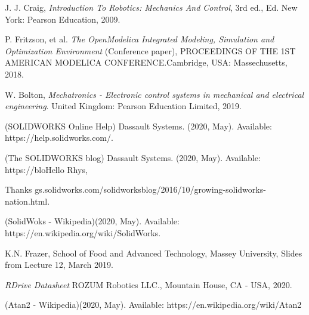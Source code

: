 \documentclass[transmag]{IEEEtran}
\begin{document}
\begin{thebibliography}{00}
 J. J. Craig, \emph{Introduction To Robotics: Mechanics And Control}, 3rd ed., Ed. New York: Pearson Education, 2009.

 P. Fritzson, et al. \emph{The OpenModelica Integrated Modeling, Simulation and Optimization Environment} (Conference paper), PROCEEDINGS OF THE 1ST AMERICAN MODELICA CONFERENCE$. $Cambridge, USA: Massechusetts, 2018.

 W. Bolton, \emph{Mechatronics - Electronic control systems in mechanical and electrical engineering}. United Kingdom: Pearson Education Limited, 2019.

 (SOLIDWORKS Online Help) Dassault Systems. (2020, May).  Available: https://help.solidworks.com/.

 (The SOLIDWORKS blog) Dassault Systems. (2020, May).  Available: https://bloHello Rhys,

Thanks gs.solidworks.com/solidworksblog/2016/10/growing-solidworks-nation.html.

 (SolidWoks - Wikipedia)(2020, May). Available: https://en.wikipedia.org/wiki/SolidWorks. 

 K.N. Frazer, School of Food and Advanced Technology, Massey University, Slides from Lecture 12, March 2019.

 \emph{RDrive Datasheet} ROZUM Robotics LLC., Mountain House, CA - USA, 2020.

 (Atan2 - Wikipedia)(2020, May). Available: https://en.wikipedia.org/wiki/Atan2
\end{thebibliography}



\clearpage
\newpage


\appendix
\label{appendix-A}




\end{document}
